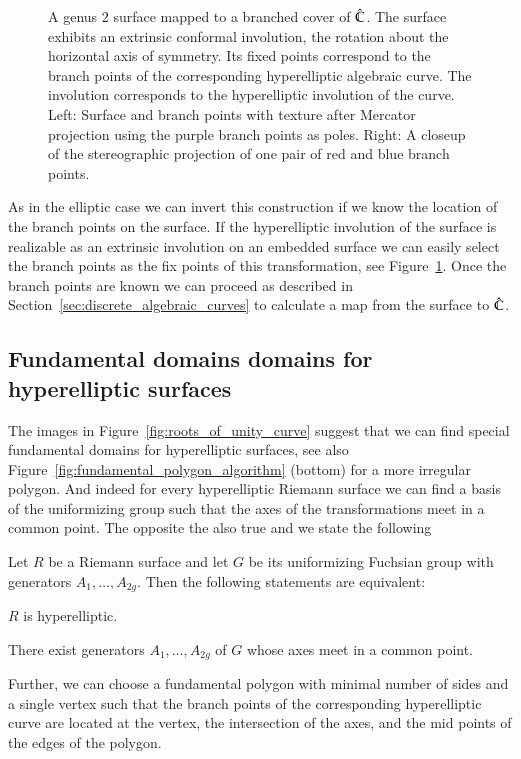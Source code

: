 \documentclass[Thesis]{subfiles}
\begin{document}
\begin{figure} 
\centering
{}
\caption{
A genus $2$ surface mapped to a branched cover of $\hat{\mathbb C}$. 
The surface exhibits an extrinsic conformal involution, the rotation about the horizontal axis of symmetry. 
Its fixed points correspond to the branch points of the corresponding hyperelliptic algebraic curve.
The involution corresponds to the hyperelliptic involution of the curve.  
Left: Surface and branch points with texture after Mercator projection using the purple
branch points as poles. 
Right: A closeup of the stereographic projection of one pair of red and blue branch points.
} 
\label{fig:genus2_branched} 
\end{figure}

As in the elliptic case we can invert this construction if we know the location of the branch points on the surface.
If the hyperelliptic involution of the surface is realizable as an extrinsic involution on an embedded surface we can easily select the branch points as the fix points of this transformation, see Figure~\ref{fig:genus2_branched}. 
Once the branch points are known we can proceed as described in Section~\ref{sec:discrete_algebraic_curves} to calculate a map from the surface to $\hat{\mathbb C}$.

\subsection{Fundamental domains domains for hyperelliptic surfaces}
\label{sec:hyperelliptic_domain}

The images in Figure~\ref{fig:roots_of_unity_curve} suggest that we can find special fundamental domains for hyperelliptic surfaces, see also Figure~\ref{fig:fundamental_polygon_algorithm} (bottom) for a more irregular polygon. 
And indeed for every hyperelliptic Riemann surface we can find a basis of the uniformizing group such that the axes of the transformations meet in a common point.
The opposite the also true and we state the following

\begin{theorem}
\label{thm:hyperelliptic}
Let $R$ be a Riemann surface and let $G$ be its uniformizing Fuchsian group with generators $A_1,\ldots,A_{2g}$.
Then the following statements are equivalent:
\begin{compactitem}
\item $R$ is hyperelliptic.
\item There exist generators $A_1,\ldots,A_{2g}$ of $G$ whose axes meet in a common point.
\end{compactitem}
Further, we can choose a fundamental polygon with minimal number of sides and a single vertex such that the branch points of the corresponding hyperelliptic curve are located at the vertex, the intersection of the axes, and the mid points of the edges of the polygon.
\end{theorem}
\end{document}
